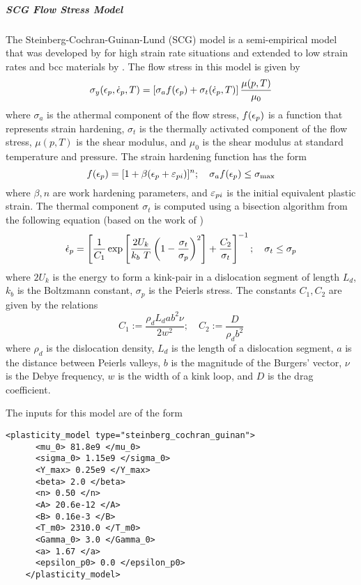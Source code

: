   \subparagraph{SCG Flow Stress Model}
  The Steinberg-Cochran-Guinan-Lund (SCG) model is a semi-empirical model
  that was developed by \cite{Steinberg80} for high strain rate
  situations and extended to low strain rates and bcc materials by
  \cite{Steinberg89}.  The flow stress in this model is given by
  \begin{equation}\label{eq:SCGL}
    \sigma_y(\Ep,\Epdot{},T) = 
     \left[\sigma_a f(\Ep) + \sigma_t (\Epdot{}, T)\right]
     \frac{\mu(p,T)}{\mu_0} 
  \end{equation}
  where $\sigma_a$ is the athermal component of the flow stress,
  $f(\Ep)$ is a function that represents strain hardening,
  $\sigma_t$ is the thermally activated component of the flow stress,
  $\mu(p,T)$ is the shear modulus, and $\mu_0$ is the shear modulus
  at standard temperature and pressure.  The strain hardening function
  has the form
  \begin{equation}
    f(\Ep) = [1 + \beta(\Ep + \Epi)]^n ; \quad
    \sigma_a f(\Ep) \le \sigma_{\text{max}}
  \end{equation}
  where $\beta, n$ are work hardening parameters, and $\Epi$ is the
  initial equivalent plastic strain.  The thermal component $\sigma_t$
  is computed using a bisection algorithm from the following equation (based
  on the work of \cite{Hoge77})
  \begin{equation}
    \Epdot{} = \left[\frac{1}{C_1}\exp\left[\frac{2U_k}{k_b~T}
      \left(1 - \frac{\sigma_t}{\sigma_p}\right)^2\right] + 
      \frac{C_2}{\sigma_t}\right]^{-1}; \quad
    \sigma_t \le \sigma_p
  \end{equation}
  where $2 U_k$ is the energy to form a kink-pair in a dislocation segment
  of length $L_d$, $k_b$ is the Boltzmann constant, $\sigma_p$ is the Peierls
  stress. The constants $C_1, C_2$ are given by the relations
  \begin{equation}
    C_1 := \frac{\rho_d L_d a b^2 \nu}{2 w^2}; \quad
    C_2 := \frac{D}{\rho_d b^2}
  \end{equation}
  where $\rho_d$ is the dislocation density, $L_d$ is the length of a
  dislocation segment, $a$ is the distance between Peierls valleys,
  $b$ is the magnitude of the Burgers' vector, $\nu$ is the Debye frequency,
  $w$ is the width of a kink loop, and $D$ is the drag coefficient.

  The inputs for this model are of the form
  \begin{Verbatim}[fontsize=\footnotesize]
    <plasticity_model type="steinberg_cochran_guinan">
      <mu_0> 81.8e9 </mu_0>
      <sigma_0> 1.15e9 </sigma_0>
      <Y_max> 0.25e9 </Y_max>
      <beta> 2.0 </beta>
      <n> 0.50 </n>
      <A> 20.6e-12 </A>
      <B> 0.16e-3 </B>
      <T_m0> 2310.0 </T_m0>
      <Gamma_0> 3.0 </Gamma_0>
      <a> 1.67 </a>
      <epsilon_p0> 0.0 </epsilon_p0>
    </plasticity_model>
  \end{Verbatim}

